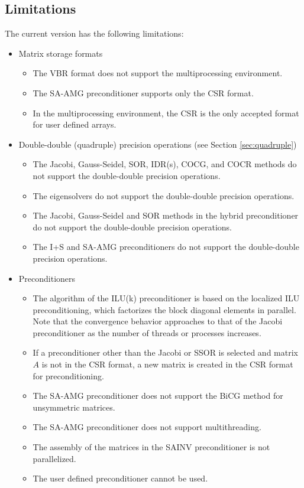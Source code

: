 \documentclass[a4paper]{article}
\begin{document}
\subsection{Limitations}
The current version has the following limitations:
\begin{itemize}

\item Matrix storage formats
\begin{itemize}
\item The VBR format does not support the multiprocessing environment.
\item The SA-AMG preconditioner supports only the CSR format. 
\item In the multiprocessing environment, the CSR is the only accepted
      format for user defined arrays.
\end{itemize}

\item Double-double (quadruple) precision operations (see Section \ref{sec:quadruple})
\begin{itemize}
\item The Jacobi, Gauss-Seidel, SOR, IDR(s), COCG, and COCR methods
      do not support the double-double precision operations.
\item The eigensolvers do not support the double-double precision operations.
\item The Jacobi, Gauss-Seidel and SOR methods in the hybrid preconditioner do not support the double-double precision operations.
\item The I+S and SA-AMG preconditioners do not support the double-double precision operations.
\end{itemize}

\item Preconditioners
\begin{itemize}
\item The algorithm of the ILU(k) preconditioner is based on the localized ILU preconditioning\cite{nakajima}, which factorizes the block diagonal elements in parallel. Note that the convergence behavior approaches to that of the Jacobi preconditioner as the number of threads or processes increases.
\item If a preconditioner other than the Jacobi or SSOR is selected 
      and matrix $A$ is not in the CSR format, a new matrix is created 
      in the CSR format for preconditioning.
\item The SA-AMG preconditioner does not support the BiCG method for unsymmetric matrices. 
\item The SA-AMG preconditioner does not support multithreading. 
\item The assembly of the matrices in the SAINV preconditioner is not parallelized.
\item The user defined preconditioner cannot be used.

\end{itemize}

\end{itemize}
\vspace*{5mm}
\end{document}
